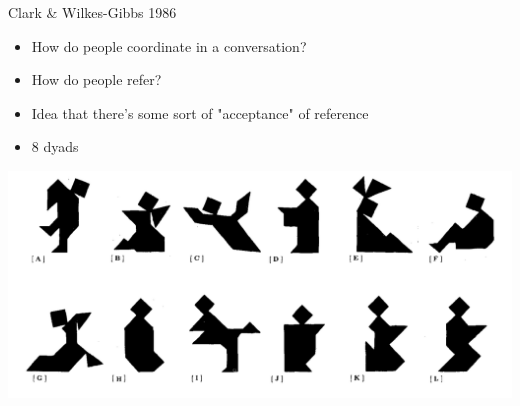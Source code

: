 \documentclass[12pt, xcolor=beamer,table,usenames,dvipsnames, ignorenonframetext, ngerman,t]{beamer}
\begin{document}
%
\begin{frame}{Clark \& Wilkes-Gibbs 1986}
	
	\begin{itemize}
		\item How do people coordinate in a conversation? 
		\item How do people refer? 
		\item Idea that there's some sort of "acceptance" of reference
		\item 8 dyads 
	\end{itemize}
	\includegraphics[width=\textwidth]{images/clark_tangrams.png}
\end{frame}
\end{document}
